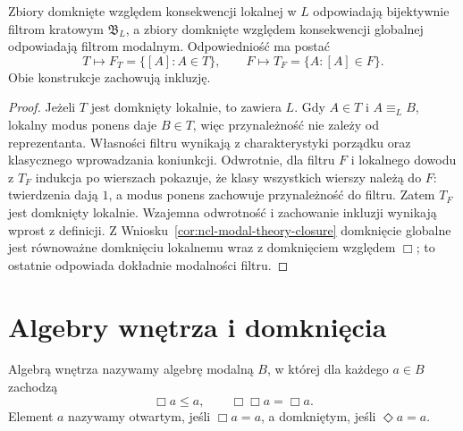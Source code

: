 \begin{wniosek}
\label{cor:ncl-modal-theories-filters}
Zbiory domknięte względem konsekwencji lokalnej
w $L$ odpowiadają bijektywnie filtrom kratowym
$\mathfrak B_L$, a zbiory domknięte względem
konsekwencji globalnej odpowiadają filtrom modalnym.
Odpowiedniość ma postać
\[
 T\longmapsto F_T=\{[A]:A\in T\},\qquad
 F\longmapsto T_F=\{A:[A]\in F\}.
\]
Obie konstrukcje zachowują inkluzję.
\end{wniosek}
\begin{proof}
Jeżeli $T$ jest domknięty lokalnie, to zawiera
$L$. Gdy $A\in T$ i $A\equiv_L B$, lokalny
modus ponens daje $B\in T$, więc przynależność
nie zależy od reprezentanta.
Własności filtru wynikają z charakterystyki
porządku oraz klasycznego wprowadzania koniunkcji.
Odwrotnie, dla filtru $F$ i lokalnego dowodu
z $T_F$ indukcja po wierszach pokazuje,
że klasy wszystkich wierszy należą do $F$:
twierdzenia dają $1$, a modus ponens zachowuje
przynależność do filtru.
Zatem $T_F$ jest domknięty lokalnie.
Wzajemna odwrotność i zachowanie inkluzji
wynikają wprost z definicji.
Z Wniosku~\ref{cor:ncl-modal-theory-closure}
domknięcie globalne jest równoważne
domknięciu lokalnemu wraz z domknięciem
względem $\Box$; to ostatnie odpowiada
dokładnie modalności filtru.
\end{proof}

\section{Algebry wnętrza i domknięcia}

\begin{definicja}
\label{def:ncl-modal-interior-algebra}
Algebrą wnętrza nazywamy algebrę modalną $B$,
w której dla każdego $a\in B$ zachodzą
\[
 \Box a\leq a,\qquad \Box\Box a=\Box a.
\]
Element $a$ nazywamy otwartym, jeśli $\Box a=a$,
a domkniętym, jeśli $\Diamond a=a$.
\end{definicja}

